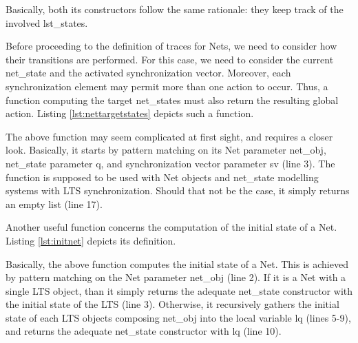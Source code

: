 	\noindent Basically, both its constructors follow the same rationale: they keep track of the 
	involved \textsf{lst\_states}. 
	
	
	Before proceeding to the definition of traces for	\textsf{Net}s, we need to consider
	how their transitions are performed. For this case, we need to consider the current
	\textsf{net\_state} and the activated synchronization vector. Moreover, each synchronization
	element may permit more than one \textsf{action} to occur. Thus, a function
	computing the target \textsf{net\_state}s must also return the resulting global action.
	Listing \ref{lst:nettargetstates} depicts such a function.
		
			
	
	
	\noindent The above function may seem complicated at first sight, and requires 
	a closer look. Basically, it starts by pattern matching on its \textsf{Net} parameter
	\textsf{net\_obj}, \textsf{net\_state} parameter \textsf{q}, and synchronization vector parameter
	\textsf{sv} (line 3). The function is supposed to be used with \textsf{Net} objects and \textsf{net\_state}
	modelling systems with \textsf{LTS} synchronization. Should that not be the case, it simply returns
	an empty list (line 17).
	
		
		Another useful function concerns the computation of the initial state of a \textsf{Net}.
	Listing \ref{lst:initnet} depicts its definition.
	
			
	
	\noindent Basically, the above function computes the initial state of a \textsf{Net}. This is achieved
	by pattern matching on the \textsf{Net} parameter \textsf{net\_obj} (line 2). If it is
	a \textsf{Net} with a single \textsf{LTS} object, than it simply returns the adequate \textsf{net\_state}
	constructor with the initial state of the \textsf{LTS} (line 3). Otherwise, it recursively
	gathers the initial state of each \textsf{LTS} objects composing \textsf{net\_obj} into
	the local variable \textsf{lq} (lines 5-9), and returns the adequate \textsf{net\_state}
	constructor with \textsf{lq} (line 10).
	
